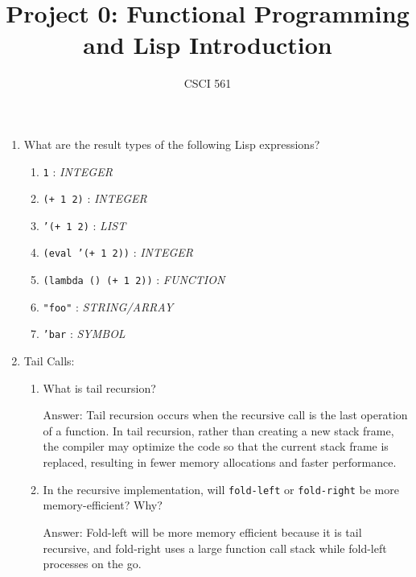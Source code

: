 \documentclass[12pt,letterpaper]{ntdhw}
\title{Project 0: Functional Programming and Lisp Introduction}
\author{CSCI 561}
\begin{document}
\pagestyle{fancyplain}

\maketitle
\thispagestyle{fancyplain}

\begin{enumerate}

  \item What are the result types of the following Lisp expressions?
  \begin{enumerate}
    \item {\tt 1} : \emph{
      INTEGER
    }
    \item {\tt (+ 1 2)} : \emph{
      INTEGER
    }
    \item {\tt '(+ 1 2)} : \emph{
      LIST
    }
    \item {\tt (eval '(+ 1 2))} : \emph{
      INTEGER
    }
    \item {\tt (lambda () (+ 1 2))} : \emph{
      FUNCTION
    }
    \item {\tt "foo"} : \emph{
      STRING/ARRAY
    }
    \item {\tt 'bar} : \emph{
      SYMBOL
    }
  \end{enumerate}

  \item Tail Calls:
  \begin{enumerate}
    \item What is tail recursion?

    \begin{emph}
      Answer: Tail recursion occurs when the recursive call is the last operation of a function.
      In tail recursion, rather than creating a new stack frame, the compiler may optimize the code
      so that the current stack frame is replaced, resulting in fewer memory allocations and faster
      performance.
    \end{emph}

    \item In the recursive implementation, will {\tt fold-left} or
    {\tt fold-right} be more memory-efficient?  Why?

    \begin{emph}
      Answer: Fold-left will be more memory efficient because it is tail recursive, and fold-right uses a large function call stack while fold-left processes on the go.
    \end{emph}
  \end{enumerate}


\end{enumerate}
\end{document}
